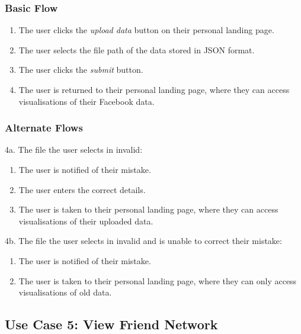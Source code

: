 \documentclass[12pt,onecolumn]{article}
\begin{document}
		\subsubsection{Basic Flow}

		\begin{enumerate}
			\item The user clicks the \emph{upload data} button on their personal landing page.

			\item The user selects the file path of the data stored in JSON format.

			\item The user clicks the \emph{submit} button.

			\item The user is returned to their personal landing page, where they can access visualisations of their Facebook data.		

		\end{enumerate}

		\subsubsection{Alternate Flows}

		4a. The file the user selects in invalid:

		\begin{enumerate}
			\item The user is notified of their mistake.

			\item The user enters the correct details.

			\item The user is taken to their personal landing page, where they can access visualisations of their uploaded data.
		\end{enumerate}

		4b. The file the user selects in invalid and is unable to correct their mistake:

		\begin{enumerate}
			\item The user is notified of their mistake.

			\item The user is taken to their personal landing page, where they can only access visualisations of old data.
		\end{enumerate}

	\subsection{Use Case 5: View Friend Network}
\end{document}
